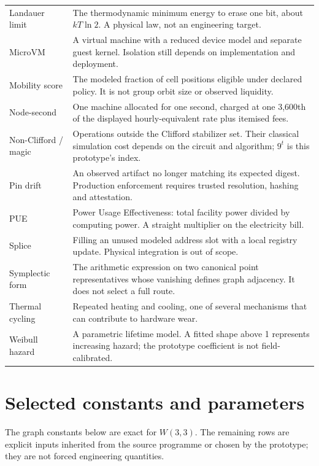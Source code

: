 \documentclass[11pt,letterpaper]{article}
\newcommand{\W}{\ensuremath{W(3,3)}}
\begin{document}
\begin{longtable}{@{}p{} p{}@{}}
Landauer limit & The thermodynamic minimum energy to erase one bit, about $kT\ln 2$. A physical law, not an engineering target.\\
MicroVM & A virtual machine with a reduced device model and separate guest kernel. Isolation still depends on implementation and deployment.\\
Mobility score & The modeled fraction of cell positions eligible under declared policy. It is not group orbit size or observed liquidity.\\
Node-second & One machine allocated for one second, charged at one 3,600th of the displayed hourly-equivalent rate plus itemised fees.\\
Non-Clifford / magic & Operations outside the Clifford stabilizer set. Their classical simulation cost depends on the circuit and algorithm; $9^t$ is this prototype's index.\\
Pin drift & An observed artifact no longer matching its expected digest. Production enforcement requires trusted resolution, hashing and attestation.\\
PUE & Power Usage Effectiveness: total facility power divided by computing power. A straight multiplier on the electricity bill.\\
Splice & Filling an unused modeled address slot with a local registry update. Physical integration is out of scope.\\
Symplectic form & The arithmetic expression on two canonical point representatives whose vanishing defines graph adjacency. It does not select a full route.\\
Thermal cycling & Repeated heating and cooling, one of several mechanisms that can contribute to hardware wear.\\
Weibull hazard & A parametric lifetime model. A fitted shape above 1 represents increasing hazard; the prototype coefficient is not field-calibrated.\\
\bottomrule
\end{longtable}

\section{Selected constants and parameters}

The graph constants below are exact for \W{}. The remaining rows are explicit
inputs inherited from the source programme or chosen by the prototype; they are
not forced engineering quantities.
\end{document}
